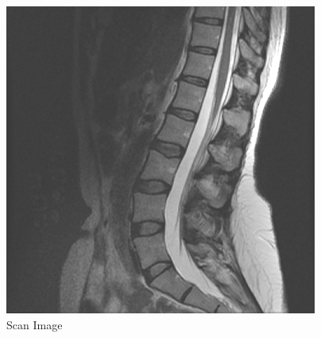 \documentclass[12pt]{tdtp}
\begin{document}
\begin{figure}[h!]
	\begin{center}
		\includegraphics[scale=0.5]{images/mri.png}
		\caption{Scan Image}
		\label{mri}
	\end{center}
\end{figure}


\end{document}
